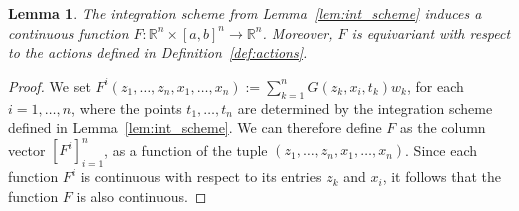 \documentclass[a4paper,12pt,reqno]{amsart}
\newtheorem{lem}[thm]{Lemma}
\theoremstyle{definition}
\theoremstyle{remark}
\begin{document}
\begin{lem}\label{lem:equiv_gen}
    The integration scheme from Lemma~\ref{lem:int_scheme} induces a continuous function $F: \mathbb R^n\times [a,b]^n \longrightarrow \mathbb R^n$. Moreover, $F$ is equivariant with respect to the actions defined in Definition~\ref{def:actions}.
\end{lem}
\begin{proof}
        We set $F^i(z_1, \ldots, z_n,x_1,\ldots, x_n) := \sum_{k=1}^n G(z_k,x_i,t_k)w_k$, for each $i=1,\ldots , n$, where the points $t_1, \ldots, t_n$ are determined by the integration scheme defined in Lemma~\ref{lem:int_scheme}. 
        We can therefore define $F$ as the column vector $[F^i]_{i=1}^n$, as a function of the tuple $(z_1, \ldots, z_n, x_1, \ldots, x_n)$. Since each function $F^i$ is continuous with respect to its entries $z_k$ and $x_i$, it follows that the function $F$ is also continuous. 
        

\end{proof}
\end{document}
